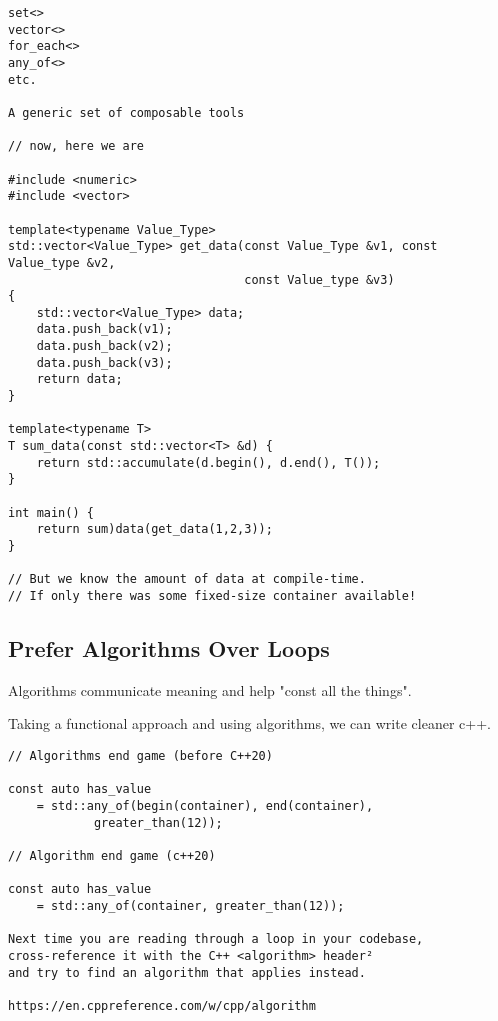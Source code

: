 \begin{verbatim}
set<>
vector<>
for_each<>
any_of<>
etc.

A generic set of composable tools

// now, here we are

#include <numeric>
#include <vector>

template<typename Value_Type>
std::vector<Value_Type> get_data(const Value_Type &v1, const Value_type &v2,
                                 const Value_type &v3)
{
    std::vector<Value_Type> data;
    data.push_back(v1);
    data.push_back(v2);
    data.push_back(v3);
    return data;
}

template<typename T>
T sum_data(const std::vector<T> &d) {
    return std::accumulate(d.begin(), d.end(), T());
}

int main() {
    return sum)data(get_data(1,2,3));
}

// But we know the amount of data at compile-time. 
// If only there was some fixed-size container available!

\end{verbatim}

\subsection{Prefer Algorithms Over Loops}

Algorithms communicate meaning and help "const all the things".

Taking a functional approach and using algorithms, we can write cleaner c++.

\begin{verbatim}
// Algorithms end game (before C++20)

const auto has_value
    = std::any_of(begin(container), end(container), 
            greater_than(12));

// Algorithm end game (c++20)

const auto has_value
    = std::any_of(container, greater_than(12));

Next time you are reading through a loop in your codebase,
cross-reference it with the C++ <algorithm> header²
and try to find an algorithm that applies instead.

https://en.cppreference.com/w/cpp/algorithm
\end{verbatim}
